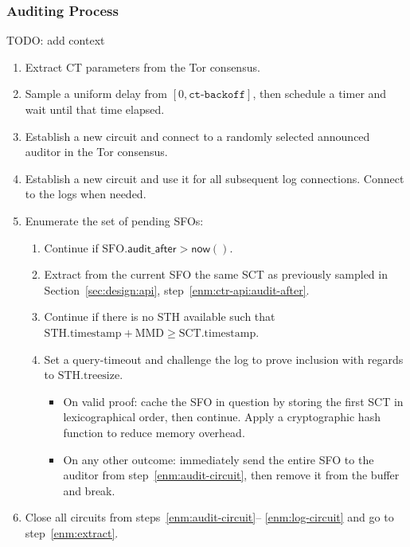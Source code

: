 \subsubsection{Auditing Process}
TODO: add context
\begin{enumerate}
	\item\label{enm:extract} Extract CT parameters from the Tor consensus.
	\item\label{enm:backoff} Sample a uniform delay from
			$[0, \texttt{ct-backoff}]$,
		then schedule a timer and wait until that time elapsed.
	\item\label{enm:audit-circuit} Establish a new circuit and connect to a
		randomly selected announced auditor in the Tor consensus.
	\item\label{enm:log-circuit} Establish a new circuit and use it for all
		subsequent log connections.  Connect to the logs when needed.
	\item\label{enm:audit-loop} Enumerate the set of pending SFOs:
		\begin{enumerate}
			\item Continue if
				$\textrm{SFO}.\mathsf{audit\_after} > \mathsf{now}()$.
			\item Extract from the current SFO the same SCT as previously
				sampled in Section~\ref{sec:design:api},
				step~\ref{enm:ctr-api:audit-after}.
			\item Continue if there is no STH available such that
					$\textrm{STH.timestamp} + \textrm{MMD} \ge
					\textrm{SCT.timestamp}$.
			\item Set a query-timeout and challenge the log to prove
				inclusion with regards to $\textrm{STH.treesize}$.
				\begin{itemize}
					\item On valid proof: cache the SFO in question by storing
						the first SCT in lexicographical order, then continue.
						Apply a cryptographic hash function to reduce memory
						overhead.
					\item On any other outcome: immediately send the entire SFO
						to the auditor from step~\ref{enm:audit-circuit}, then
						remove it from the buffer and break.
				\end{itemize}
		\end{enumerate}
	\item Close all circuits from steps~\ref{enm:audit-circuit}--%
		\ref{enm:log-circuit} and go to step~\ref{enm:extract}.
\end{enumerate}

